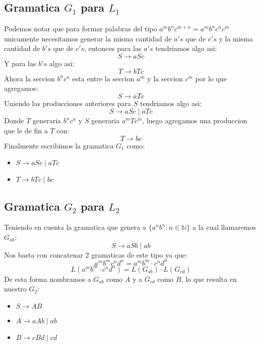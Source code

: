 \documentclass[spanish, draft]{article}
\begin{document}
    \subsection{Gramatica $G_1$ para $L_1$}
        Podemos notar que para formar palabras del tipo $a^mb^nc^{m+n} = a^mb^nc^nc^m$
        unicamente necesitamos generar la misma cantidad de $a's$ que de $c's$ y la misma cantidad de $b's$ que de $c's$,
        entonces para las $a's$ tendriamos algo asi:
        $$S \longrightarrow aSc$$
        Y para las $b's$ algo asi:
        $$T \longrightarrow bTc$$
        Ahora la seccion $b^nc^n$ esta entre la seccion $a^m$ y la seccion $c^m$ por lo que agregamos:
        $$S \longrightarrow aTc$$
        Uniendo las producciones anteriores para $S$ tendriamos algo asi:
        $$S \longrightarrow aSc \mid aTc$$
        Donde $T$ generaria $b^nc^n$ y $S$ generaria $a^mTc^m$, luego
        agregamos una produccion que le de fin a $T$ con:
        $$T \longrightarrow bc$$
        Finalmente escribimos la gramatica $G_1$ como:
        \begin{itemize}
            \item[] $S \longrightarrow aSc \mid aTc$
            \item[] $T \longrightarrow bTc \mid bc$
        \end{itemize}

    \subsection{Gramatica $G_2$ para $L_2$}
        Teniendo en cuenta la gramatica que genera a $\{a^nb^n \colon n \in \mathbb{N}\}$ a la cual llamaremos $G_{ab}$:
        $$S \longrightarrow aSb \mid ab$$
        Nos basta con concatenar 2 gramaticas de este tipo ya que:
        $$a^mb^mc^nd^n = a^mb^m \cdot c^nd^n$$
        $$L(a^mb^m \cdot c^nd^n) = L(G_{ab}) \cdot L(G_{cd})$$
        De esta forma nombramos a $G_{ab}$ como $A$ y a $G_{cd}$ como $B$, lo que resulta en nuestro $G_2$:
        \begin{itemize}
            \item[] $S \longrightarrow AB$
            \item[] $A \longrightarrow aAb \mid ab$
            \item[] $B \longrightarrow cBd \mid cd$
        \end{itemize}
\end{document}
